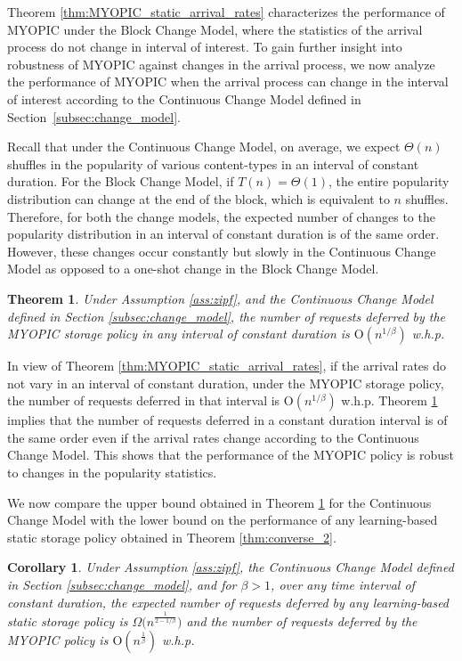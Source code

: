 \documentclass[10pt, conference, letterpaper]{IEEEtran}
\newtheorem{corollary}{Corollary}
\newtheorem{theorem}{Theorem}
\def \OO {\mathrm{O}}
\begin{document}
Theorem \ref{thm:MYOPIC_static_arrival_rates} characterizes the
performance of MYOPIC under the Block Change Model, where the
statistics of the arrival process do not change in interval of
interest. To gain further insight into robustness of MYOPIC against
changes in the arrival process, we now analyze the performance of
MYOPIC when the arrival process can change in the interval of interest
according to the Continuous Change Model defined in
Section~\ref{subsec:change_model}.

Recall that under the Continuous Change Model, on average, we expect
$\Theta(n)$ shuffles in the popularity of various content-types in an
interval of constant duration. For the Block Change Model, if $T(n) =
\Theta(1)$, the entire popularity distribution can change at the end
of the block, which is equivalent to $n$ shuffles. Therefore, for both
the change models, the expected number of changes to the popularity
distribution in an interval of constant duration is of the same
order. However, these changes occur constantly but slowly in the
Continuous Change Model as opposed to a one-shot change in the Block
Change Model.

\begin{theorem}
	\label{thm:MYOPIC_changing_arrival_rates}
	Under Assumption \ref{ass:zipf}, and the Continuous Change Model
	defined in Section \ref{subsec:change_model}, the number of requests
	deferred by the MYOPIC storage policy in any interval of constant
	duration is $\OO(n^{1/\beta})$ w.h.p.
\end{theorem}

In view of Theorem \ref{thm:MYOPIC_static_arrival_rates}, if the
arrival rates do not vary in an interval of constant duration, under
the MYOPIC storage policy, the number of requests deferred in that
interval is $\OO(n^{1/\beta})$ w.h.p. Theorem
\ref{thm:MYOPIC_changing_arrival_rates} implies that the number
of requests deferred in a constant duration interval is of the same
order even if the arrival rates change according to the Continuous
Change Model. This shows that the performance of the MYOPIC policy is
robust to changes in the popularity statistics.



We now compare the upper bound obtained in Theorem \ref{thm:MYOPIC_changing_arrival_rates} for the Continuous Change Model with the lower bound on the performance of any learning-based static storage policy obtained in Theorem \ref{thm:converse_2}.

\begin{corollary}
	\label{cor:MYOPIC_changing_arrival_rates}
	Under Assumption \ref{ass:zipf}, the Continuous Change Model defined in
	Section \ref{subsec:change_model}, and for $\beta > 1$, over any time
	interval of constant duration, the expected number of requests deferred by
	any learning-based static storage policy is $\Omega\big(n^{\frac{1}{2-1/\beta}}\big)$ and the number of requests deferred by the MYOPIC policy is $\OO(n^{\frac{1}{\beta}})$
	w.h.p.
\end{corollary}
\end{document}
